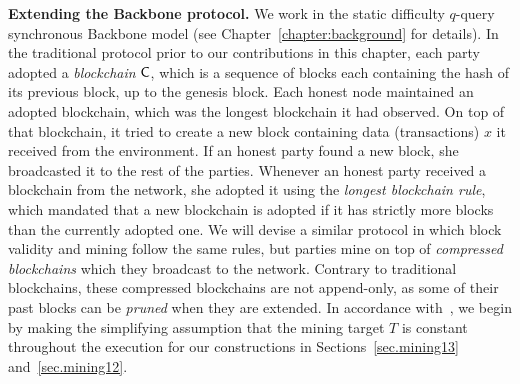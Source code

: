 \textbf{Extending the Backbone protocol.}
We work in the static difficulty $q$-query synchronous Backbone model
(see Chapter~\ref{chapter:background} for details). In the traditional protocol
prior to our contributions in this chapter, each party adopted a
\emph{blockchain} $\mathsf{C}$, which is a sequence of blocks each containing the
hash of its previous block, up to the genesis block. Each honest node maintained
an adopted blockchain, which was the longest blockchain it had observed. On top
of that blockchain, it tried to create a new block containing data
(transactions) $x$ it received from the environment. If an
honest party found a new block, she broadcasted it to the rest of the parties.
Whenever an honest party received a blockchain from the network, she adopted it
using the \emph{longest blockchain rule}, which mandated that a new blockchain
is adopted if it has strictly more blocks than the currently adopted one.
We will devise a similar protocol in which block validity and mining follow the
same rules, but parties mine on top of \emph{compressed blockchains} which they
broadcast to the network. Contrary to traditional blockchains, these compressed
blockchains are not append-only, as some of their past blocks can be
\emph{pruned} when they are extended.
In accordance with~\cite{backbone},
we begin by making the simplifying assumption that the mining target $T$ is
constant throughout the execution for our constructions in
Sections~\ref{sec.mining13} and~\ref{sec.mining12}.

%
%

